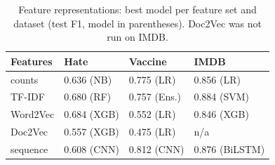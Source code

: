 \begin{table}[t]
\centering
\caption{Feature representations: best model per feature set and dataset (test F1, model in parentheses). Doc2Vec was not run on IMDB.}
\label{tab:features}
\begin{tabular}{llll}
\toprule
Features & Hate & Vaccine & IMDB \\
\midrule
counts & 0.636 (NB) & 0.775 (LR) & 0.856 (LR) \\
TF-IDF & 0.680 (RF) & 0.757 (Ens.) & 0.884 (SVM) \\
Word2Vec & 0.684 (XGB) & 0.552 (LR) & 0.846 (XGB) \\
Doc2Vec & 0.557 (XGB) & 0.475 (LR) & n/a \\
sequence & 0.608 (CNN) & 0.812 (CNN) & 0.876 (BiLSTM) \\
\bottomrule
\end{tabular}
\end{table}